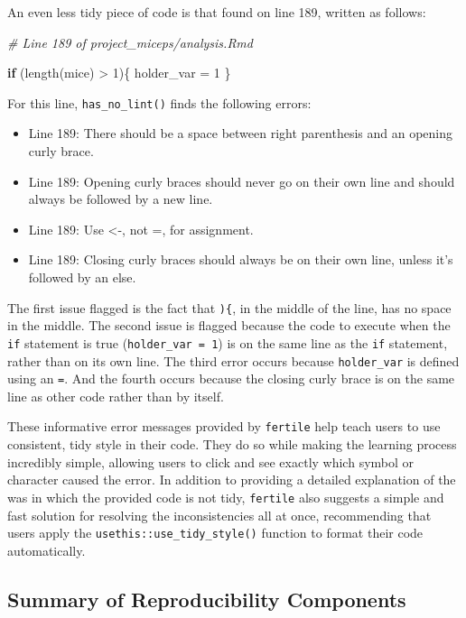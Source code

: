\documentclass[12pt,twoside]{reedthesis}
\newenvironment{Shaded}{\begin{snugshade}}{\end{snugshade}}
\newcommand{\CommentTok}[1]{\textcolor[rgb]{0.56,0.35,0.01}{\textit{#1}}}
\newcommand{\ControlFlowTok}[1]{\textcolor[rgb]{0.13,0.29,0.53}{\textbf{#1}}}
\newcommand{\DecValTok}[1]{\textcolor[rgb]{0.00,0.00,0.81}{#1}}
\newcommand{\FunctionTok}[1]{\textcolor[rgb]{0.00,0.00,0.00}{#1}}
\newcommand{\NormalTok}[1]{#1}
\newcommand{\OtherTok}[1]{\textcolor[rgb]{0.56,0.35,0.01}{#1}}
\newcommand{\SpecialCharTok}[1]{\textcolor[rgb]{0.00,0.00,0.00}{#1}}
\begin{document}
An even less tidy piece of code is that found on line 189, written as follows:
\begin{Shaded}
\begin{Highlighting}[]
\CommentTok{\# Line 189 of \textasciigrave{}project\_miceps/analysis.Rmd\textquotesingle{}}

\ControlFlowTok{if}\NormalTok{ (}\FunctionTok{length}\NormalTok{(mice) }\SpecialCharTok{\textgreater{}} \DecValTok{1}\NormalTok{)\{ holder\_var }\OtherTok{=} \DecValTok{1}\NormalTok{ \}}
\end{Highlighting}
\end{Shaded}
For this line, \texttt{has\_no\_lint()} finds the following errors:
\begin{itemize}
\item
  Line 189: There should be a space between right parenthesis and an opening curly brace.
\item
  Line 189: Opening curly braces should never go on their own line and should always be followed by a new line.
\item
  Line 189: Use \textless-, not =, for assignment.
\item
  Line 189: Closing curly braces should always be on their own line, unless it's followed by an else.
\end{itemize}
The first issue flagged is the fact that \texttt{)\{}, in the middle of the line, has no space in the middle. The second issue is flagged because the code to execute when the \texttt{if} statement is true (\texttt{holder\_var\ =\ 1}) is on the same line as the \texttt{if} statement, rather than on its own line. The third error occurs because \texttt{holder\_var} is defined using an \texttt{=}. And the fourth occurs because the closing curly brace is on the same line as other code rather than by itself.

These informative error messages provided by \texttt{fertile} help teach users to use consistent, tidy style in their code. They do so while making the learning process incredibly simple, allowing users to click and see exactly which symbol or character caused the error. In addition to providing a detailed explanation of the was in which the provided code is not tidy, \texttt{fertile} also suggests a simple and fast solution for resolving the inconsistencies all at once, recommending that users apply the \texttt{usethis::use\_tidy\_style()} function to format their code automatically.

\hypertarget{summary-of-reproducibility-components}{%
\subsection{Summary of Reproducibility Components}\label{summary-of-reproducibility-components}}
\end{document}
